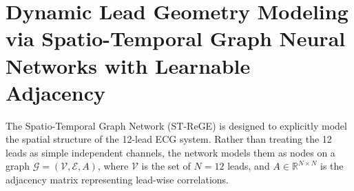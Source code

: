 \documentclass[12pt,a4paper]{report}
\begin{document}
\begin{table}[H]
\caption{1D ResNet-18 Architecture Layout}
\label{tab:resnet_arch}
\centering
{}
\end{table}

\section{Dynamic Lead Geometry Modeling via Spatio-Temporal Graph Neural Networks with Learnable Adjacency}
The Spatio-Temporal Graph Network (ST-ReGE) is designed to explicitly model the spatial structure of the 12-lead ECG system. Rather than treating the 12 leads as simple independent channels, the network models them as nodes on a graph $\mathcal{G} = (\mathcal{V}, \mathcal{E}, A)$, where $\mathcal{V}$ is the set of $N=12$ leads, and $A \in \mathbb{R}^{N \times N}$ is the adjacency matrix representing lead-wise correlations.
\end{document}
